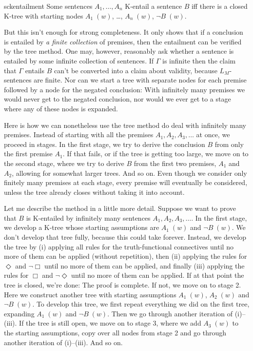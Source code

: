 \begin{observation}{sckentailment}
  Some sentences $A_{1},\ldots,A_{n}$ K-entail a sentence $B$ iff there is a
  closed K-tree with starting nodes $A_{1}\; (w)$, \ldots, $A_{n}\; (w)$,
  $\neg B\; (w)$.
\end{observation}

But this isn't enough for strong completeness. It only shows that if a
conclusion is entailed by \emph{a finite collection} of premises, then the
entailment can be verified by the tree method. One may, however, reasonably ask
whether a sentence is entailed by some infinite collection of sentences. If
$\Gamma$ is infinite then the claim that $\Gamma$ entails $B$ can't be converted
into a claim about validity, because $L_{M}$-sentences are finite. Nor can we
start a tree with separate nodes for each premise followed by a node for the
negated conclusion: With infinitely many premises we would never get to the
negated conclusion, nor would we ever get to a stage where any of these nodes is
expanded.

Here is how we can nonetheless use the tree method do deal with infinitely many
premises. Instead of starting with all the premises
$A_{1}, A_{2}, A_{3}, \ldots$ at once, we proceed in stages. In the first stage,
we try to derive the conclusion $B$ from only the first premise $A_{1}$. If
that fails, or if the tree is getting too large, we move on to the second stage,
where we try to derive $B$ from the first two premises, $A_{1}$ and $A_{2}$,
allowing for somewhat larger trees. And so on. Even though we consider only
finitely many premises at each stage, every premise will eventually be
considered, unless the tree already closes without taking it into account.

Let me describe the method in a little more detail. Suppose we want to prove
that $B$ is K-entailed by infinitely many sentences
$A_{1}, A_{2}, A_{3},\ldots$. In the first stage, we develop a K-tree whose
starting assumptions are $A_{1}\; (w)$ and $\neg B\; (w)$. We don't develop that
tree fully, because this could take forever. Instead, we develop the tree by (i)
applying all rules for the truth-functional connectives until no more of them
can be applied (without repetition), then (ii) applying the rules for $\Diamond$
and $\neg \Box$ until no more of them can be applied, and finally (iii) applying
the rules for $\Box$ and $\neg \Diamond$ until no more of them can be applied.
If at that point the tree is closed, we're done: The proof is complete. If not,
we move on to stage 2. Here we construct another tree with starting assumptions
$A_{1}\; (w)$, $A_{2}\; (w)$ and $\neg B\; (w)$. To develop this tree, we first
repeat everything we did on the first tree, expanding $A_{1}\; (w)$ and
$\neg B\; (w)$. Then we go through another iteration of (i)--(iii). If the tree
is still open, we move on to stage 3, where we add $A_{3}\; (w)$ to the starting
assumptions, copy over all nodes from stage 2 and go through another iteration
of (i)--(iii). And so on.

